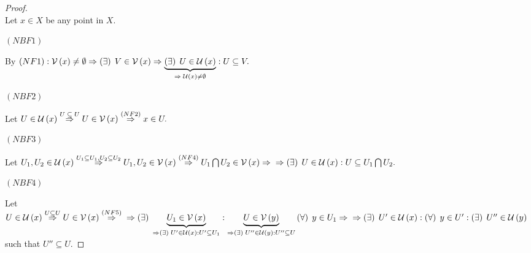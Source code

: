 \documentclass[a4paper,12pt]{report}
\newcommand{\nbh}[1]
{
\cg{V}\left(#1\right)
}
\newcommand{\nbhb}[1]
{
\cg{U}\left(#1\right)
}
\begin{document}
\begin{proof}
\necessity\\
Let $x\in X$ be any point in $X$.

\begin{center}
$\left(NBF1\right)$
\end{center}
By $\left(NF1\right): \nbh{x} \neq \emptyset \Rightarrow \fe{\exists} V \in \nbh{x} \Rightarrow \underbrace{\fe{\exists} U\in\nbhb{x}}_{\Rightarrow\; \nbhb{x} \neq \emptyset}: U\subseteq V.$ 

\begin{center}
$\left(NBF2\right)$
\end{center}

Let $U\in\nbhb{x} \overset{U\;\subseteq\; U}{\Rightarrow} U\in \nbh{x} \overset{\left(NF2\right)}{\Rightarrow} x\in U.$

\begin{center}
$\left(NBF3\right)$
\end{center}

Let $U_1,U_2 \in \nbhb{x} \overset{U_1\subseteq U_1,U_2\subseteq U_2}{\Rightarrow} U_1,U_2\in\nbh{x} \overset{\left(NF4\right)}{\Rightarrow} U_1 \bigcap U_2 \in \nbh{x} \Rightarrow \\ \Rightarrow \fe{\exists} U\in \nbhb{x}: U \subseteq U_1\bigcap	U_2.$

\begin{center}
$\left(NBF4\right)$
\end{center}

Let $U\in\nbhb{x} \overset{U\subseteq U}{\Rightarrow} U\in\nbh{x} \overset{\left(NF5\right)}{\Rightarrow} \\ \Rightarrow \fe{\exists} \underbrace{U_1 \in \nbh{x}}_{\Rightarrow \fe{\exists} U' \in\nbhb{x}: U' \subseteq U_1 }: \underbrace{U \in \nbh{y}}_{\Rightarrow \fe{\exists} U'' \in\nbhb{y}: U''\subseteq U}  \fe{\forall} y \in U_1 \Rightarrow \\ \Rightarrow \fe{\exists} U'\in\nbhb{x}: \fe{\forall} y \in U': \fe{\exists} U'' \in\nbhb{y} $ such that $U''\subseteq U.$

\end{proof}
\end{document}
